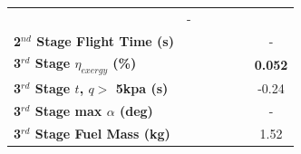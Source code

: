 \begin{table}[ht]
\begin{tabular}{l c c c c c c}
	& -
	\\
	\textbf{2$^{nd}$ Stage Flight Time (s)}
	& \secondFlightTimemSPARTANNinetyFiveNoReturn
	& \secondFlightTimemSPARTANNinetySevenFiveNoReturn
	& \secondFlightTimemSPARTANStandardNoReturn
	& \secondFlightTimemSPARTANOneHundredTwoFiveNoReturn
	& \secondFlightTimemSPARTANOneHundredFiveNoReturn
	& -
	\\
	\hline 
	\textbf{3$^{rd}$ Stage $\eta_{exergy}$ (\%)}
	& \textbf{\thirddExergyEffmSPARTANNinetyFiveNoReturn}
	& \textbf{\thirddExergyEffmSPARTANNinetySevenFiveNoReturn}
	& \textbf{\thirddExergyEffmSPARTANStandardNoReturn}
	& \textbf{\thirddExergyEffmSPARTANOneHundredTwoFiveNoReturn}
	& \textbf{\thirddExergyEffmSPARTANOneHundredFiveNoReturn}
	& \textbf{0.052}
	\\
	\textbf{3$^{rd}$ Stage $t$, $q >$ 5kpa (s)}
	& \thirdqOverFivemSPARTANNinetyFiveNoReturn
	& \thirdqOverFivemSPARTANNinetySevenFiveNoReturn
	& \thirdqOverFivemSPARTANStandardNoReturn
	& \thirdqOverFivemSPARTANOneHundredTwoFiveNoReturn
	& \thirdqOverFivemSPARTANOneHundredFiveNoReturn
	&-0.24
	\\
	\textbf{3$^{rd}$ Stage max $\alpha$ (deg)}
	& \thirdmaxAoAmSPARTANNinetyFiveNoReturn
	& \thirdmaxAoAmSPARTANNinetySevenFiveNoReturn
	& \thirdmaxAoAmSPARTANStandardNoReturn
	& \thirdmaxAoAmSPARTANOneHundredTwoFiveNoReturn
	& \thirdmaxAoAmSPARTANOneHundredFiveNoReturn
	& -
	\\
	\textbf{3$^{rd}$ Stage Fuel Mass (kg)}
	& \thirdmFuelmSPARTANNinetyFiveNoReturn
	& \thirdmFuelmSPARTANNinetySevenFiveNoReturn
	& \thirdmFuelmSPARTANStandardNoReturn
	& \thirdmFuelmSPARTANOneHundredTwoFiveNoReturn
	& \thirdmFuelmSPARTANOneHundredFiveNoReturn
	&1.52
	\\
	\hline 
\end{tabular}

	
\end{table}


